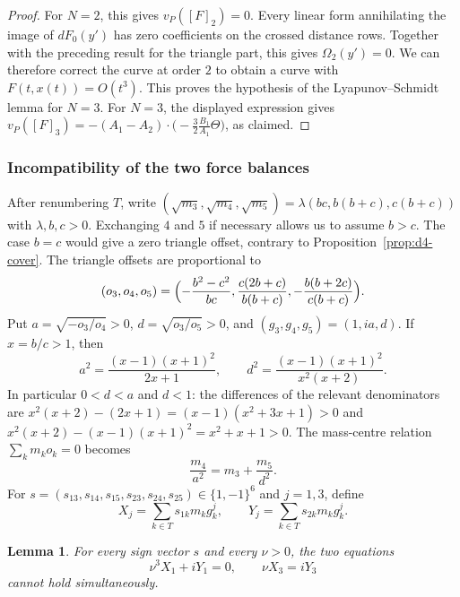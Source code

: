 \documentclass[11pt]{amsart}
\newtheorem{lemma}[theorem]{Lemma}
\theoremstyle{definition}
\theoremstyle{remark}
\begin{document}
\begin{proof}
{For $N=2$, this gives $v_P([F]_2)=0$.
Every linear form annihilating the image of $dF_0(y')$ has zero coefficients on the
crossed distance rows. Together with the preceding result for the triangle part,
this gives $\Omega_2(y')=0$. We can therefore correct the curve at order $2$ to obtain}
{a curve with $F(t,x(t))=O(t^3)$.
This proves the hypothesis of the Lyapunov--Schmidt lemma for $N=3$.
For $N=3$, the displayed expression gives
$v_P([F]_3)=-(A_1-A_2)\cdot\big(-\frac32\frac{B_1}{A_1}\Theta\big)$, as claimed.}
\end{proof}

{\subsubsection{Incompatibility of the two force balances}\label{d4-census}
After renumbering $T$, write
$(\sqrt{m_3},\sqrt{m_4},\sqrt{m_5})=\lambda(bc,b(b+c),c(b+c))$
with $\lambda,b,c>0$. Exchanging $4$ and $5$ if necessary allows us to assume
$b>c$. The case $b=c$ would give a zero triangle offset, contrary to
Proposition~\ref{prop:d4-cover}. The triangle offsets are proportional to
\[
 (o_3,o_4,o_5)=\Bigl(-\frac{b^2-c^2}{bc},
 \frac{c(2b+c)}{b(b+c)},-\frac{b(b+2c)}{c(b+c)}\Bigr).
\]
Put $a=\sqrt{-o_3/o_4}>0$, $d=\sqrt{o_3/o_5}>0$, and
$(g_3,g_4,g_5)=(1,ia,d)$.  If $x=b/c>1$, then
\[
 a^2=\frac{(x-1)(x+1)^2}{2x+1},\qquad
 d^2=\frac{(x-1)(x+1)^2}{x^2(x+2)}.
\]
In particular $0<d<a$ and $d<1$: the differences of the relevant
denominators are
$x^2(x+2)-(2x+1)=(x-1)(x^2+3x+1)>0$ and
$x^2(x+2)-(x-1)(x+1)^2=x^2+x+1>0$.
The mass-centre relation $\sum_km_ko_k=0$ becomes
\begin{equation}\label{eq:d4-positive-centre}
 \frac{m_4}{a^2}=m_3+\frac{m_5}{d^2}.
\end{equation}
For $s=(s_{13},s_{14},s_{15},s_{23},s_{24},s_{25})\in\{1,-1\}^6$
and $j=1,3$, define
\[
 X_j=\sum_{k\in T}s_{1k}m_kg_k^j,\qquad
 Y_j=\sum_{k\in T}s_{2k}m_kg_k^j.
\]

\begin{lemma}\label{lem:d4-census}
For every sign vector $s$ and every $\nu>0$, the two equations
\[
 \nu^3X_1+iY_1=0,\qquad \nu X_3=iY_3
\]
cannot hold simultaneously.
\end{lemma}

}
\end{document}
